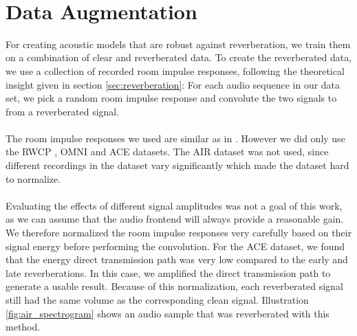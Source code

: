\begin{minipage}{\linewidth}
	\label{fig:final_tdnn}
	\vspace{5mm}
\end{minipage}\\
\section{Data Augmentation}
For creating acoustic models that are robust against reverberation, we train them on a combination of clear and reverberated data. To create the reverberated data, we use a collection of recorded room impulse responses, following the theoretical insight given in section \ref{sec:reverberation}: For each audio sequence in our data set, we pick a random room impulse response and convolute the two signals to from a reverberated signal. \\ \\
The room impulse responses we used are similar as in \cite{ritter2016training}. However we did only use the RWCP \cite{nakamura2000acoustical}, OMNI \cite{stewart2010database} and ACE \cite{eaton2015ace} datasets. The AIR dataset \cite{jeub2009binaural} was not used, since different recordings in the dataset vary significantly which made the dataset hard to normalize.\\ \\
Evaluating the effects of different signal amplitudes was not a goal of this work, as we can assume that the audio frontend will always provide a reasonable gain. We therefore normalized the room impulse responses very carefully based on their signal energy before performing the convolution. For the ACE dataset, we found that the energy direct transmission path was very low compared to the early and late reverberations. In this case, we amplified the direct transmission path to generate a usable result. Because of this normalization, each reverberated signal still had the same volume as the corresponding clean signal. 
Illustration \ref{fig:air_spectrogram} shows an audio sample that was reverberated with this method. 

